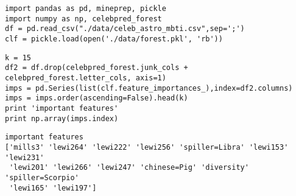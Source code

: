 \documentclass[12pt,fleqn]{article}\usepackage{../common}
\begin{document}
\begin{verbatim}
import pandas as pd, mineprep, pickle
import numpy as np, celebpred_forest
df = pd.read_csv("./data/celeb_astro_mbti.csv",sep=';')
clf = pickle.load(open('./data/forest.pkl', 'rb'))
\end{verbatim}


\begin{verbatim}
k = 15
df2 = df.drop(celebpred_forest.junk_cols + celebpred_forest.letter_cols, axis=1)
imps = pd.Series(list(clf.feature_importances_),index=df2.columns)
imps = imps.order(ascending=False).head(k)
print 'important features'
print np.array(imps.index)
\end{verbatim}

\begin{verbatim}
important features
['mills3' 'lewi264' 'lewi222' 'lewi256' 'spiller=Libra' 'lewi153' 'lewi231'
 'lewi201' 'lewi266' 'lewi247' 'chinese=Pig' 'diversity' 'spiller=Scorpio'
 'lewi165' 'lewi197']
\end{verbatim}
\end{document}
